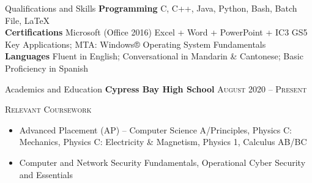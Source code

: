 \begin{resume_section}{Qualifications and Skills}
	\textbf{Programming} \> C, C++, Java, Python, Bash, Batch File, \LaTeX \\
	\textbf{Certifications} \> Microsoft (Office 2016) Excel + Word + PowerPoint + IC3 GS5 Key Applications; MTA: Windows® Operating System Fundamentals \\
	\textbf{Languages} \> Fluent in English; Conversational in Mandarin \& Cantonese; Basic Proficiency in Spanish
\end{resume_section}

\medskip

\begin{resume_section}{Academics and Education}
	\textbf{Cypress Bay High School} \hspace*{\fill} \textsc{August 2020 -- Present}

	\smallskip

	\textsc{Relevant Coursework}

	\begin{itemize}
		\setlength{\labelsep}{0.1in}
		\item Advanced Placement (AP) -- Computer Science A/Principles, Physics C: Mechanics, Physics C: Electricity \& Magnetism, Physics 1, Calculus AB/BC
		\item Computer and Network Security Fundamentals, Operational Cyber Security and Essentials
	\end{itemize}
\end{resume_section}

\medskip

